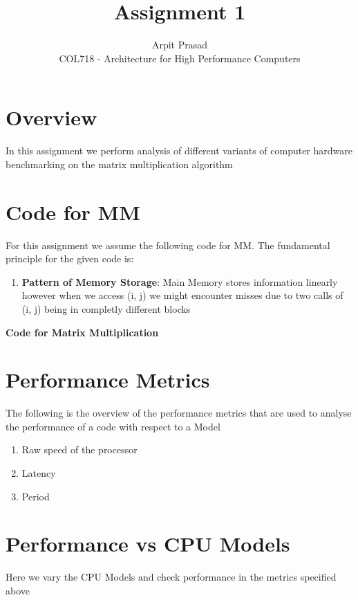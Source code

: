 \documentclass[12pt]{article}
\begin{document}
 
 
\title{Assignment 1}
\author{Arpit Prasad\\ 
COL718 - Architecture for High Performance Computers}

\maketitle

\section{Overview}

In this assignment we perform analysis of different variants of computer hardware benchmarking on the matrix multiplication algorithm

\section{Code for MM}
\noindent For this assignment we assume the following code for MM. The fundamental principle for the given code is:
\begin{enumerate}
    \item \textbf{Pattern of Memory Storage}: Main Memory stores information linearly however when we access (i, j) we might encounter misses due to two calls of (i, j) being in completly different blocks
\end{enumerate}

\noindent\textbf{Code for Matrix Multiplication}


\section{Performance Metrics}
\noindent The following is the overview of the performance metrics that are used to analyse the performance of a code with respect to a Model
\begin{enumerate}
    \item Raw speed of the processor
    \item Latency 
    \item Period
\end{enumerate}

\section{Performance vs CPU Models}

\noindent Here we vary the CPU Models and check performance in the metrics specified above

 
 
\end{document}
